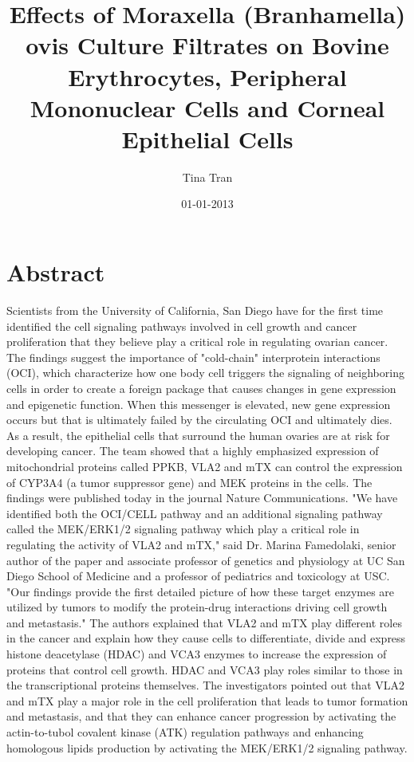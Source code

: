 \documentclass{article}%
\title{Effects of Moraxella (Branhamella) ovis Culture Filtrates on Bovine Erythrocytes, Peripheral Mononuclear Cells and Corneal Epithelial Cells}%
\author{Tina Tran}%
\affil{Zhang Zhongjing College of Chinese Medicine, Nanyang Institute of Technology, China}%
\date{01{-}01{-}2013}%
\begin{document}
%
\normalsize%
\maketitle%
\section{Abstract}%
\label{sec:Abstract}%
Scientists from the University of California, San Diego have for the first time identified the cell signaling pathways involved in cell growth and cancer proliferation that they believe play a critical role in regulating ovarian cancer.\newline%
The findings suggest the importance of "cold{-}chain" interprotein interactions (OCI), which characterize how one body cell triggers the signaling of neighboring cells in order to create a foreign package that causes changes in gene expression and epigenetic function. When this messenger is elevated, new gene expression occurs but that is ultimately failed by the circulating OCI and ultimately dies. As a result, the epithelial cells that surround the human ovaries are at risk for developing cancer. The team showed that a highly emphasized expression of mitochondrial proteins called PPKB, VLA2 and mTX can control the expression of CYP3A4 (a tumor suppressor gene) and MEK proteins in the cells.\newline%
The findings were published today in the journal Nature Communications.\newline%
"We have identified both the OCI/CELL pathway and an additional signaling pathway called the MEK/ERK1/2 signaling pathway which play a critical role in regulating the activity of VLA2 and mTX," said Dr. Marina Famedolaki, senior author of the paper and associate professor of genetics and physiology at UC San Diego School of Medicine and a professor of pediatrics and toxicology at USC. "Our findings provide the first detailed picture of how these target enzymes are utilized by tumors to modify the protein{-}drug interactions driving cell growth and metastasis."\newline%
The authors explained that VLA2 and mTX play different roles in the cancer and explain how they cause cells to differentiate, divide and express histone deacetylase (HDAC) and VCA3 enzymes to increase the expression of proteins that control cell growth. HDAC and VCA3 play roles similar to those in the transcriptional proteins themselves. The investigators pointed out that VLA2 and mTX play a major role in the cell proliferation that leads to tumor formation and metastasis, and that they can enhance cancer progression by activating the actin{-}to{-}tubol covalent kinase (ATK) regulation pathways and enhancing homologous lipids production by activating the MEK/ERK1/2 signaling pathway.\newline%
\end{document}
